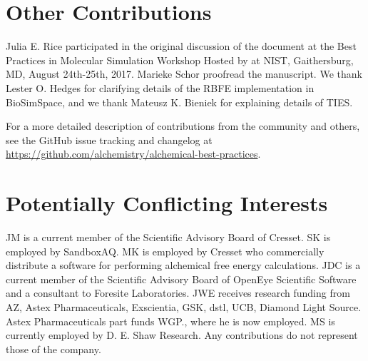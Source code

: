 \documentclass[9pt,bestpractices]{livecoms}
\newcommand{\githubrepository}{\url{https://github.com/alchemistry/alchemical-best-practices}} %
\begin{document}
\section*{Other Contributions}
%
Julia E. Rice participated in the original discussion of the document at the Best Practices in Molecular Simulation Workshop Hosted by at NIST, Gaithersburg, MD, August 24th-25th, 2017.
Marieke Schor proofread the manuscript.
We thank Lester O. Hedges for clarifying details of the RBFE implementation in BioSimSpace, and we thank Mateusz K. Bieniek for explaining details of TIES.


For a more detailed description of contributions from the community and others, 
see the GitHub issue tracking and changelog at \githubrepository.


\section*{Potentially Conflicting Interests}
JM is a current member of the Scientific Advisory Board of Cresset. 
SK is employed by SandboxAQ.
MK is employed by Cresset who commercially distribute a software for performing alchemical free energy calculations.
JDC is a current member of the Scientific Advisory Board of OpenEye Scientific Software and a consultant to Foresite Laboratories.
JWE receives research funding from AZ, Astex Pharmaceuticals, Exscientia, GSK, dstl, UCB, Diamond Light Source. Astex Pharmaceuticals part funds WGP., where he is now employed.
MS is currently employed by D. E. Shaw Research. Any contributions do not represent those of the company. 
\end{document}
